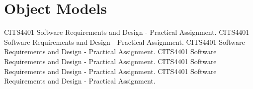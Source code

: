 \section{Object Models}

\par
CITS4401 Software Requirements and Design - Practical Assignment.
CITS4401 Software Requirements and Design - Practical Assignment.
CITS4401 Software Requirements and Design - Practical Assignment.
CITS4401 Software Requirements and Design - Practical Assignment.
CITS4401 Software Requirements and Design - Practical Assignment.
CITS4401 Software Requirements and Design - Practical Assignment.
